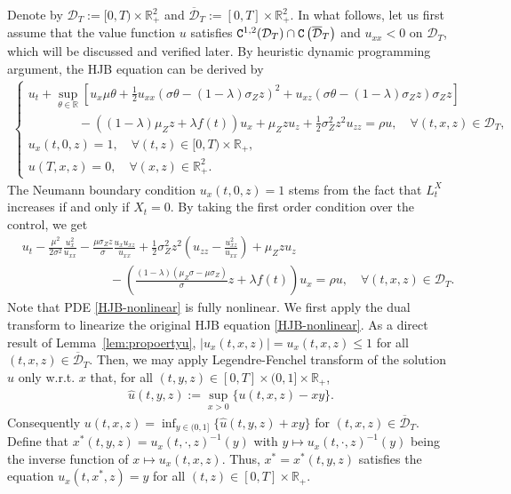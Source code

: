 \documentclass[11pt,times,letter]{article}
\newcommand{\R}{\mathds{R}}
\newcommand{\C}{{\tt{C}}}
\numberwithin{equation}{section}
\begin{document}
Denote by $\mathcal{D}_T:=[0,T)\times \R_+^2$ and $\overline{\mathcal{D}}_T:=[0,T]\times \R_+^2$. In what follows, let us first assume that the value function $u$ satisfies ${\C}^{1,2}(\mathcal{D}_T)\cap {\C}\left(\overline{\mathcal{D}}_T\right)$ and $u_{xx} < 0 $ on $\mathcal{D}_T$, which will be discussed and verified later. By heuristic dynamic programming argument, the HJB equation can be derived by
\begin{align}\label{HJB}
\begin{cases}
\displaystyle u_t+\sup_{\theta\in\R}\left[u_x\mu\theta+\frac{1}{2}u_{xx}(\sigma\theta-(1-\lambda)\sigma_Zz)^2+u_{xz}(\sigma\theta-(1-\lambda)\sigma_Zz)\sigma_Z z \right] \\[0.6em]
\displaystyle \qquad\qquad-((1-\lambda)\mu_Zz+\lambda f(t)) u_x+\mu_Z zu_z+\frac{1}{2}\sigma_Z^2z^2u_{zz}=\rho u,\quad \forall(t,x,z)\in\mathcal{D}_T,\\[0.6em]
\displaystyle u_x(t,0,z)=1,\quad \forall(t,z)\in[0,T)\times \R_+,\\[0.6em]
\displaystyle u(T,x,z)=0,\quad \forall(x,z)\in\R_+^2.
\end{cases}
\end{align}
The Neumann boundary condition $u_x(t,0,z)=1$ stems from the fact that $L_t^X$ increases if and only if $X_t=0$. 
 By taking the first order condition over the control,  we get
\begin{align}\label{HJB-nonlinear}
 &u_t-\frac{\mu^2}{2\sigma^2}\frac{u_x^2}{u_{xx}}-\frac{\mu\sigma_Z z}{\sigma}\frac{u_xu_{xz}}{u_{xx}}+\frac{1}{2}\sigma_Z^2z^2\left(u_{zz}-\frac{u_{xz}^2}{u_{xx}}\right)+\mu_Z zu_z\\
 &\qquad\qquad\qquad\quad-\left(\frac{(1-\lambda)(\mu_Z\sigma-\mu\sigma_Z)}{\sigma}z+\lambda f(t)\right)u_x =\rho u,\quad \forall(t,x,z)\in\mathcal{D}_T.\nonumber
\end{align}
Note that PDE \eqref{HJB-nonlinear} is fully nonlinear.  We first apply the dual transform to linearize the original HJB equation \eqref{HJB-nonlinear}. As a direct result of Lemma~\ref{lem:propoertyu},  $|u_x(t,x,z)|= u_x(t,x,z)\leq 1$ for all $(t,x,z)\in\overline{\mathcal{D}}_T$. Then, we may apply Legendre-Fenchel transform of the solution $u$ only w.r.t. $x$ that, for all $(t,y,z)\in[0,T]\times (0,1]\times\R_+$,
\begin{align}\label{eq:LFT-u}
\hat{u}(t,y,z):=\sup_{x>0}\{u(t,x,z)-xy\}. 
\end{align}
Consequently $u(t,x,z)=\inf_{y\in(0,1]}\{\hat{u}(t,y,z)+xy\}$ for $(t,x,z)\in\overline{\mathcal{D}}_T$. Define that $x^*(t,y,z)=u_x(t,\cdot,z)^{-1}(y)$ with $y\mapsto u_x(t,\cdot,z)^{-1}(y)$ being the inverse function of $x\mapsto u_x(t,x,z)$. Thus, $x^*=x^*(t,y,z)$ satisfies the equation $u_x(t,x^*,z)=y$ for all $(t,z)\in[0,T]\times \R_+$. 
\end{document}

